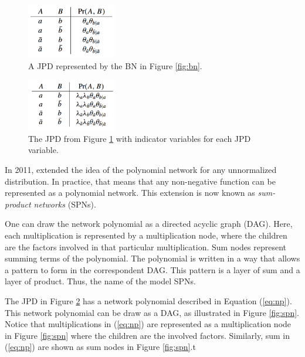 \begin{figure}[hbt]
    \begin{center}
    \includegraphics[width=0.35\textwidth]{figures/jpd.png}
    \caption{A JPD represented by the BN in Figure \ref{fig:bn}.}
    \label{fig:jpd}
    \end{center}
\end{figure}

\begin{figure}[hbt]
    \begin{center}
    \includegraphics[width=0.35\textwidth]{figures/jpd_ind.png}
    \caption{The JPD from Figure \ref{fig:jpd} with indicator variables for each JPD variable.}
    \label{fig:jpd_ind}
    \end{center}
\end{figure}

In 2011, \cite{Poon2011} extended the idea of the polynomial network for any unnormalized distribution.
In practice, that means that any non-negative function can be represented as a polynomial network.
This extension is now known as \emph{sum-product networks} (SPNs).

One can draw the network polynomial as a directed acyclic graph (DAG).
Here, each multiplication is represented by a multiplication node, where the children are the factors involved in that particular multiplication.
Sum nodes represent summing terms of the polynomial.
The polynomial is written in a way that allows a pattern to form in the correspondent DAG.
This pattern is a layer of sum and a layer of product.
Thus, the name of the model SPNs.

\begin{example}
The JPD in Figure \ref{fig:jpd_ind} has a network polynomial described in Equation (\ref{eq:np}).
This network polynomial can be draw as a DAG, as illustrated in Figure \ref{fig:spn}.
Notice that multiplications in (\ref{eq:np}) are represented as a multiplication node in Figure \ref{fig:spn} where the children are the involved factors.
Similarly, sum in (\ref{eq:np}) are shown as sum nodes in Figure \ref{fig:spn}.t
\end{example}

